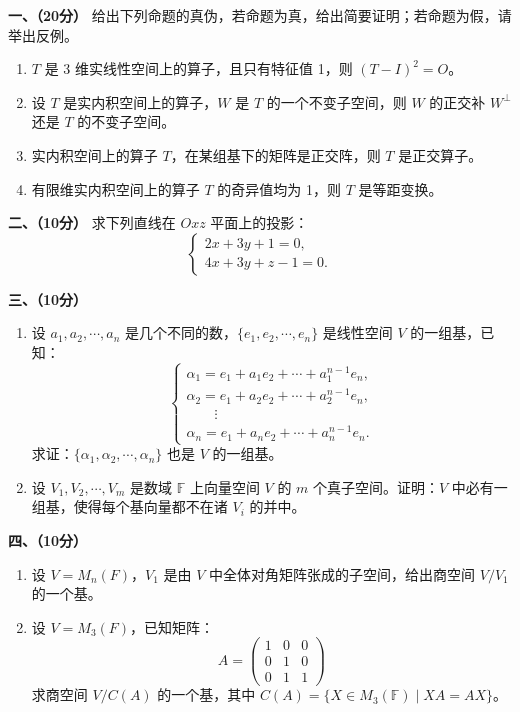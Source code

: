\documentclass[a4paper,12pt]{ctexart}
\begin{document}
\noindent\textbf{一、（20分）} 给出下列命题的真伪，若命题为真，给出简要证明；若命题为假，请举出反例。
\begin{enumerate}
    \item $T$ 是 3 维实线性空间上的算子，且只有特征值 1，则 $(T-I)^2 = O$。
    \item 设 $T$ 是实内积空间上的算子，$W$ 是 $T$ 的一个不变子空间，则 $W$ 的正交补 $W^\perp$ 还是 $T$ 的不变子空间。
    \item 实内积空间上的算子 $T$，在某组基下的矩阵是正交阵，则 $T$ 是正交算子。
    \item 有限维实内积空间上的算子 $T$ 的奇异值均为 1，则 $T$ 是等距变换。
\end{enumerate}

\vspace{1.5em}
\noindent\textbf{二、（10分）} 求下列直线在 $Oxz$ 平面上的投影：
\[
\begin{cases}
2x + 3y + 1 = 0, \\
4x + 3y + z - 1 = 0.
\end{cases}
\]

\vspace{1.5em}
\noindent\textbf{三、（10分）}
\begin{enumerate}
    \item 设 $a_1, a_2, \cdots, a_n$ 是几个不同的数，$\{e_1, e_2, \cdots, e_n\}$ 是线性空间 $V$ 的一组基，已知：
    \[
    \begin{cases}
    \alpha_1 = e_1 + a_1 e_2 + \cdots + a_1^{n-1} e_n, \\
    \alpha_2 = e_1 + a_2 e_2 + \cdots + a_2^{n-1} e_n, \\
    \qquad \vdots \\
    \alpha_n = e_1 + a_n e_2 + \cdots + a_n^{n-1} e_n.
    \end{cases}
    \]
    求证：$\{\alpha_1, \alpha_2, \cdots, \alpha_n\}$ 也是 $V$ 的一组基。
    
    \item 设 $V_1, V_2, \cdots, V_m$ 是数域 $\mathbb{F}$ 上向量空间 $V$ 的 $m$ 个真子空间。证明：$V$ 中必有一组基，使得每个基向量都不在诸 $V_i$ 的并中。
\end{enumerate}

\vspace{1.5em}
\noindent\textbf{四、（10分）}
\begin{enumerate}
    \item 设 $V = M_n(F)$，$V_1$ 是由 $V$ 中全体对角矩阵张成的子空间，给出商空间 $V/V_1$ 的一个基。
    
    \item 设 $V = M_3(F)$，已知矩阵：
    \[
    A = \begin{pmatrix} 1 & 0 & 0 \\ 0 & 1 & 0 \\ 0 & 1 & 1 \end{pmatrix}
    \]
    求商空间 $V/C(A)$ 的一个基，其中 $C(A) = \{X \in M_3(\mathbb{F}) \mid XA = AX\}$。
\end{enumerate}
\end{document}
